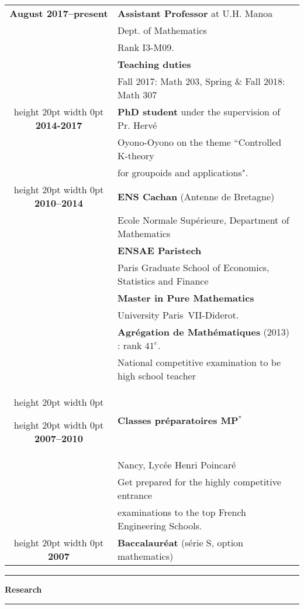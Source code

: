 \documentclass[a4paper,11pt]{article}
\newcommand\espace{\vrule height 20pt width 0pt}
\newcommand{\titre}[1]{%
	\begin{center}
	\bigskip
	\rule{\textwidth}{1pt}
	\par\vspace{0.1cm}
        \textbf{\large #1}
	\par\rule{\textwidth}{1pt}
	\end{center}
	\bigskip
	}
\begin{document}
\begin{tabular}{cp{}}

\textbf{August 2017--present} &  \textbf{Assistant Professor} at U.H. Manoa  \\
						& Dept. of Mathematics\\
						& Rank I3-M09. \\
						& \textbf{Teaching duties} \\
						& Fall 2017: Math 203, Spring \& Fall 2018: Math 307\\ 
\espace
\textbf{2014-2017} &  \textbf{PhD student} under the supervision of Pr. Hervé  \\
						& Oyono-Oyono on the theme ``Controlled K-theory \\
						& for groupoids and applications". \\
\espace
\textbf{2010--2014} &  \textbf{ENS Cachan} (Antenne de Bretagne) \\
				    & 	Ecole Normale Supérieure, Department of Mathematics \\
                              & \textbf{ENSAE Paristech}\\
				&	Paris Graduate School of Economics, Statistics and Finance\\
                                   & \textbf{Master in Pure Mathematics}\\  & University Paris~VII-Diderot. \\
                                   & \textbf{Agrégation de Mathématiques} (2013) : rank $41^e$. \\
				& National competitive examination to be high school teacher\\
\espace

\espace
\textbf{2007--2010} &\textbf{Classes préparatoires MP$^*$ } \\
					& Nancy, Lycée Henri Poincaré\\
					& Get prepared for the highly competitive entrance \\
				& examinations to the top French Engineering Schools.\\

\espace
\textbf{2007} & \textbf{Baccalauréat} (série S, option mathematics) 
 \\

\end{tabular}

\newpage
\titre{Research}
\end{document}
